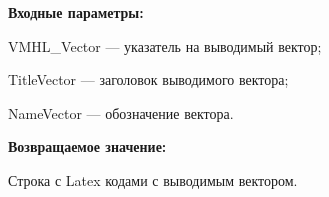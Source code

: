 \textbf{Входные параметры:}
 
    VMHL\_Vector --- указатель на выводимый вектор;
 
    TitleVector --- заголовок выводимого вектора;
 
    NameVector --- обозначение вектора.
	
\textbf{Возвращаемое значение:}

Строка с Latex кодами с выводимым вектором.